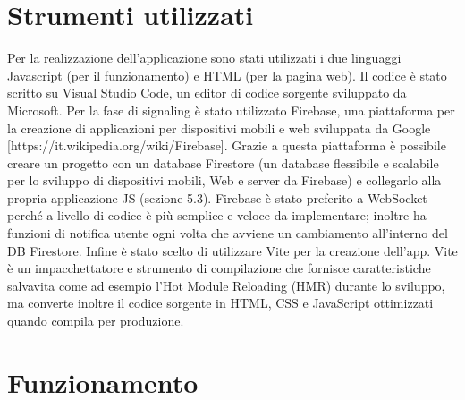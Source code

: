\documentclass[11pt, a4paper, openany]{book}
\begin{document}
  	\section{Strumenti utilizzati}
	Per la realizzazione dell'applicazione sono stati utilizzati i due linguaggi Javascript (per il funzionamento) e HTML (per la pagina web). Il codice è stato scritto su Visual Studio Code, un editor di codice sorgente sviluppato da Microsoft. Per la fase di signaling è stato utilizzato Firebase, una piattaforma per la creazione di applicazioni per dispositivi mobili e web sviluppata da Google [https://it.wikipedia.org/wiki/Firebase]. Grazie a questa piattaforma è possibile creare un progetto con un database Firestore (un database flessibile e scalabile per lo sviluppo di dispositivi mobili, Web e server da Firebase) e collegarlo alla propria applicazione JS (sezione 5.3). Firebase è stato preferito a WebSocket perché a livello di codice è più semplice e veloce da implementare; inoltre ha funzioni di notifica utente ogni volta che avviene un cambiamento all'interno del DB Firestore. Infine è stato scelto di utilizzare Vite per la creazione dell'app. Vite è un impacchettatore e strumento di compilazione che fornisce caratteristiche salvavita come ad esempio l'Hot Module Reloading (HMR) durante lo sviluppo, ma converte inoltre il codice sorgente in HTML, CSS e JavaScript ottimizzati quando compila per produzione. 
	
	\newpage
	 
  	\section{Funzionamento}
\end{document}
